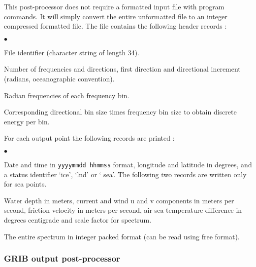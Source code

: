 \vspace{\baselineskip} 
\noindent
This post-processor does not require a formatted input file with program
commands. It will simply convert the entire unformatted file to an integer
compressed formatted file. The file contains the following header records :

\begin{list}{$\bullet$}{\itemsep 0mm \parsep 0mm}
\item File identifier (character string of length 34).
\item Number of frequencies and directions, first direction and directional
      increment (radians, oceanographic convention).
\item Radian frequencies of each frequency bin.
\item Corresponding directional bin size times frequency bin size to obtain
      discrete energy per bin.
\end{list}

\noindent
For each output point the following records are printed :
\begin{list}{$\bullet$}{\itemsep 0mm \parsep 0mm}
\item Date and time in {\tt yyyymmdd hhmmss} format, longitude and latitude in
      degrees, and a status identifier `{\F ice}', `{\F lnd}' or `{\F
      sea}'. The following two records are written only for sea points.
\item Water depth in meters, current and wind u and v components in meters per
      second, friction velocity in meters per second, air-sea temperature
      difference in degrees centigrade and scale factor for spectrum.
\item The entire spectrum in integer packed format (can be read using free
      format).
\end{list}


\pb
\vsssub
\subsubsection{GRIB output post-processor} \label{sec:post_g}
\vsssub


